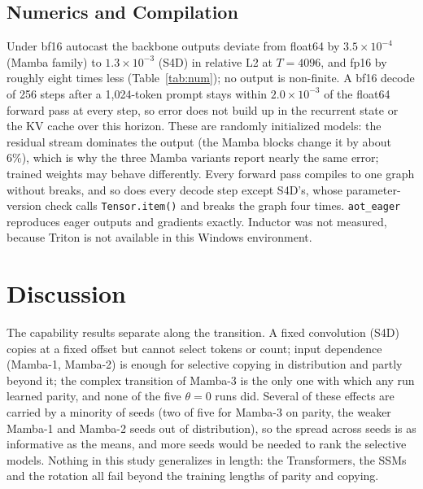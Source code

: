 \documentclass[conference]{IEEEtran}
\newcommand{\mamba}{Mamba}
\begin{document}
\subsection{Numerics and Compilation}
\begin{table}[t]
\centering
\caption{Relative L2 error of the backbone output against float64.}
\label{tab:num}
\scriptsize

\end{table}
\begin{table}[t]
\centering
\caption{torch.compile readiness.}
\label{tab:compile}
\scriptsize

\end{table}
Under bf16 autocast the backbone outputs deviate from float64 by
$3.5\times10^{-4}$ (\mamba{} family) to $1.3\times10^{-3}$ (S4D) in relative
L2 at $T=4096$, and fp16 by roughly eight times less
(Table~\ref{tab:num}); no output is non-finite. A bf16 decode of 256 steps
after a 1{,}024-token prompt stays within $2.0\times10^{-3}$ of the float64
forward pass at every step, so error does not build up in the recurrent
state or the KV cache over this horizon. These are randomly initialized
models: the residual stream dominates the output (the \mamba{} blocks change
it by about 6\%), which is why the three \mamba{} variants report nearly the
same error; trained weights may behave differently. Every forward pass
compiles to one graph without breaks, and so does every decode step except
S4D's, whose parameter-version check calls \texttt{Tensor.item()} and
breaks the graph four times. \texttt{aot\_eager} reproduces eager outputs
and gradients exactly. Inductor was not measured, because Triton is not
available in this Windows environment.

\section{Discussion}
The capability results separate along the transition. A fixed convolution
(S4D) copies at a fixed offset but cannot select tokens or count; input
dependence (\mamba{}-1, \mamba{}-2) is enough for selective copying in
distribution and partly beyond it; the complex transition of \mamba{}-3
is the only one with which any run learned parity, and none of the five
$\theta=0$ runs did. Several of these effects are carried by a minority of
seeds (two of five for \mamba{}-3 on parity, the weaker \mamba{}-1 and
\mamba{}-2 seeds out of distribution), so the spread across seeds is as
informative as the means, and more seeds would be needed to rank the
selective models. Nothing in this study generalizes in length: the
Transformers, the SSMs and the rotation all fail beyond the training
lengths of parity and copying.
\end{document}
